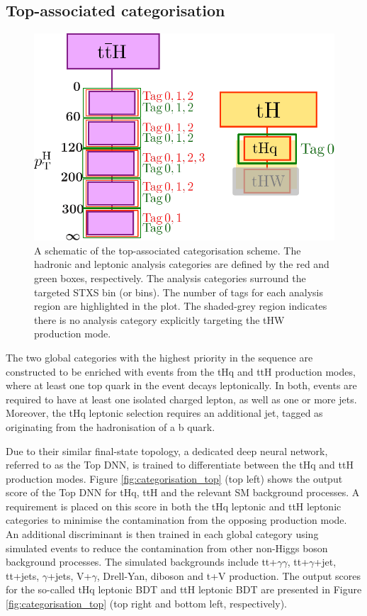 \subsection{Top-associated categorisation}\label{sec:top_categorisation}
\begin{figure}
  \centering
  \includegraphics[width=.6\textwidth]{Figures/hgg_overview/categorisation_schematics/TopSchematic.pdf}
  \caption[Top-associated categorisation schematic]
  {
    A schematic of the top-associated categorisation scheme. The hadronic and leptonic analysis categories are defined by the red and green boxes, respectively. The analysis categories surround the targeted STXS bin (or bins). The number of tags for each analysis region are highlighted in the plot. The shaded-grey region indicates there is no analysis category explicitly targeting the tHW production mode.
  }
  \label{fig:top_categorisation_schematic}
\end{figure}
The two global categories with the highest priority in the sequence are constructed to be enriched with events from the tHq and ttH production modes, where at least one top quark in the event decays leptonically. In both, events are required to have at least one isolated charged lepton, as well as one or more jets. Moreover, the tHq leptonic selection requires an additional jet, tagged as originating from the hadronisation of a b quark. 

Due to their similar final-state topology, a dedicated deep neural network, referred to as the Top DNN, is trained to differentiate between the tHq and ttH production modes. Figure \ref{fig:categorisation_top} (top left) shows the output score of the Top DNN for tHq, ttH and the relevant SM background processes. A requirement is placed on this score in both the tHq leptonic and ttH leptonic categories to minimise the contamination from the opposing production mode. An additional discriminant is then trained in each global category using simulated events to reduce the contamination from other non-Higgs boson background processes. The simulated backgrounds include tt+$\gamma\gamma$, tt+$\gamma$+jet, tt+jets, $\gamma$+jets, V+$\gamma$, Drell-Yan, diboson and t+V production. The output scores for the so-called tHq leptonic BDT and ttH leptonic BDT are presented in Figure \ref{fig:categorisation_top} (top right and bottom left, respectively). 

